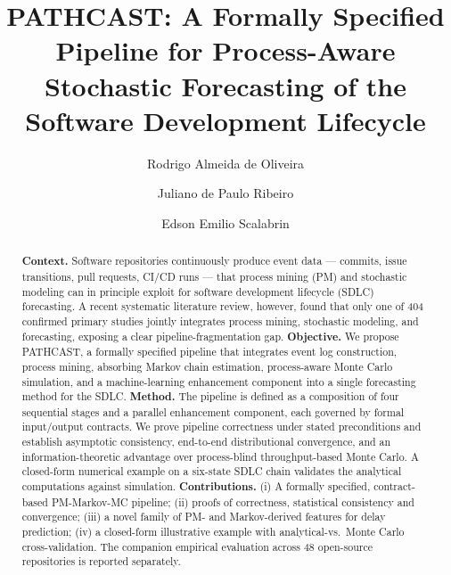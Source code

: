 \documentclass[review,3p,times]{elsarticle}
\begin{document}
\begin{frontmatter}

\title{PATHCAST: A Formally Specified Pipeline for Process-Aware
       Stochastic Forecasting of the Software Development Lifecycle}

\author[pucpr]{Rodrigo Almeida de Oliveira}

\author[pucpr]{Juliano de Paulo Ribeiro}

\author[pucpr]{Edson Emilio Scalabrin}




\begin{abstract}
\textbf{Context.}
Software repositories continuously produce event data --- commits, issue
transitions, pull requests, CI/CD runs --- that process mining (PM) and
stochastic modeling can in principle exploit for software development
lifecycle (SDLC) forecasting. A recent systematic literature review,
however, found that only one of 404 confirmed primary studies jointly
integrates process mining, stochastic modeling, and forecasting, exposing
a clear pipeline-fragmentation gap.
\textbf{Objective.}
We propose PATHCAST, a formally specified pipeline that integrates event
log construction, process mining, absorbing Markov chain estimation,
process-aware Monte Carlo simulation, and a machine-learning enhancement
component into a single forecasting method for the SDLC.
\textbf{Method.}
The pipeline is defined as a composition of four sequential stages and a
parallel enhancement component, each governed by formal input/output
contracts. We prove pipeline correctness under stated preconditions and
establish asymptotic consistency, end-to-end distributional convergence,
and an information-theoretic advantage over process-blind throughput-based
Monte Carlo. A closed-form numerical example on a six-state SDLC chain
validates the analytical computations against simulation.
\textbf{Contributions.}
(i) A formally specified, contract-based PM-Markov-MC pipeline;
(ii) proofs of correctness, statistical consistency and convergence;
(iii) a novel family of PM- and Markov-derived features for delay
prediction; (iv) a closed-form illustrative example with analytical-vs.\
Monte Carlo cross-validation. The companion empirical evaluation across
48 open-source repositories is reported separately.
\end{abstract}


\end{frontmatter}
\end{document}
